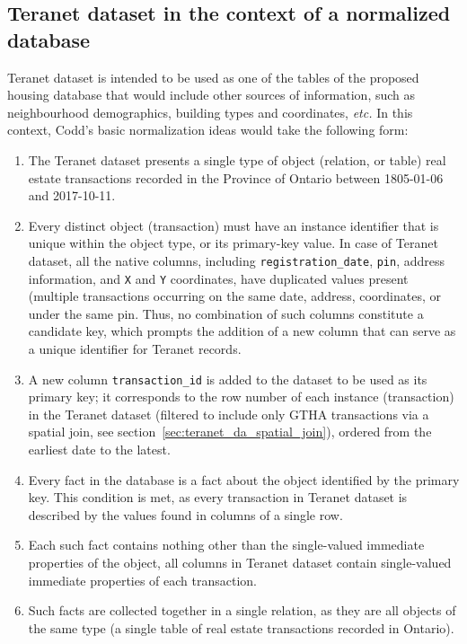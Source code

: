 \documentclass[11pt]{article}
\begin{document}
    \subsection{Teranet dataset in the context of a normalized database} \label{subsec:teranet_db_norm}

    Teranet dataset is intended to be used as one of the tables of the proposed housing database that would include other sources of information, such as neighbourhood demographics, building types and coordinates, \textit{etc.}
    In this context, Codd's basic normalization ideas would take the following form:

    \begin{enumerate}
        \item The Teranet dataset presents a single type of object (relation, or table) \textemdash real estate transactions recorded in the Province of Ontario between 1805-01-06 and 2017-10-11.
        \item Every distinct object (transaction) must have an instance identifier that is unique within the object type, or its primary-key value.
        In case of Teranet dataset, all the native columns, including \texttt{registration\_date}, \texttt{pin}, address information, and \texttt{X} and \texttt{Y} coordinates, have duplicated values present (multiple transactions occurring on the same date, address, coordinates, or under the same pin.
        Thus, no combination of such columns constitute a candidate key, which prompts the addition of a new column that can serve as a unique identifier for Teranet records.
        \item A new column \texttt{transaction\_id} is added to the dataset to be used as its primary key;
        it corresponds to the row number of each instance (transaction) in the Teranet dataset (filtered to include only GTHA transactions via a spatial join, see section~\ref{sec:teranet_da_spatial_join}), ordered from the earliest date to the latest.
        \item Every fact in the database is a fact about the object identified by the primary key.
        This condition is met, as every transaction in Teranet dataset is described by the values found in columns of a single row.
        \item Each such fact contains nothing other than the single-valued immediate properties of the object, all columns in Teranet dataset contain single-valued immediate properties of each transaction.
        \item Such facts are collected together in a single relation, as they are all objects of the same type (a single table of real estate transactions recorded in Ontario).
    \end{enumerate}
\end{document}
